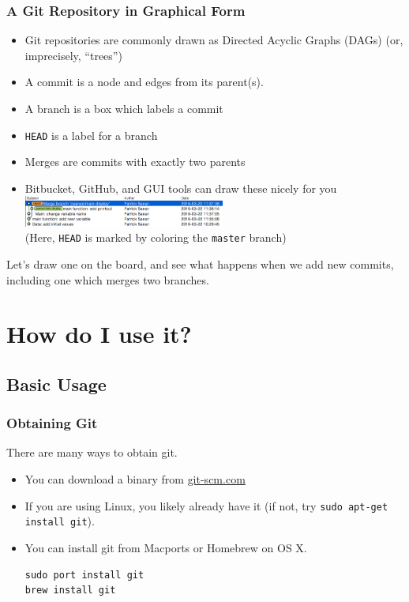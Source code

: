 \documentclass{beamer}
\begin{document}
\begin{frame}[fragile]
\frametitle{A Git Repository in Graphical Form}
\begin{itemize}
\item Git repositories are commonly drawn as Directed Acyclic Graphs (DAGs) (or, imprecisely, ``trees'')
\item A commit is a node and edges from its parent(s).
\item A branch is a box which labels a commit
\item \texttt{HEAD} is a label for a branch
\item Merges are commits with exactly two parents
\item Bitbucket, GitHub, and GUI tools can draw these nicely for you
\includegraphics[width=250px]{gitx.png}\\
(Here, \texttt{HEAD} is marked by coloring the \texttt{master} branch)
\end{itemize}
Let's draw one on the board, and see what happens when we add new commits, including one which merges two branches.
\end{frame}

\section{How do I use it?}

\subsection{Basic Usage}
\begin{frame}[fragile]
\frametitle{Obtaining Git}
There are many ways to obtain git.
\begin{itemize}
  \item You can download a binary from \href{http://git-scm.com}{git-scm.com}
\item If you are using Linux, you likely already have it (if not, try \lstinline{sudo apt-get install git}).
\item You can install git from Macports or Homebrew on OS X.
\begin{lstlisting}
sudo port install git
brew install git
\end{lstlisting}

\end{itemize}
\end{frame}
\end{document}

